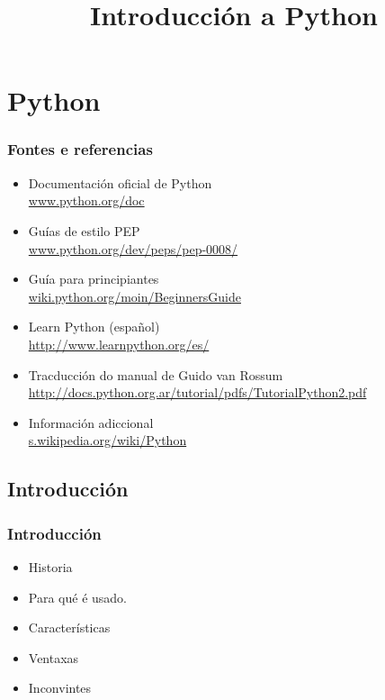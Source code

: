 
\title[Python]{Introducción a Python}
\date{}
\author[Fran Rúa/Breixo Camiña]{}
\institute{}

\section{Python}
\label{sec:Python}

\begin{frame}
  \titlepage
\end{frame}

\begin{frame}
  \frametitle{Fontes e referencias}
  \begin{itemize}
  \item Documentación oficial de Python\\
    {\color{blue}\url{www.python.org/doc}}
  \item Guías de estilo PEP\\
    {\color{blue}\url{www.python.org/dev/peps/pep-0008/}}
  \item Guía para principiantes\\
    {\color{blue}\url{wiki.python.org/moin/BeginnersGuide}}
  \item Learn Python (español)\\
    {\color{blue}\url{http://www.learnpython.org/es/}}
  \item Tracducción do manual de Guido van Rossum
    {\color{blue}\url{http://docs.python.org.ar/tutorial/pdfs/TutorialPython2.pdf}}
  \item Información adiccional\\
    {\color{blue}\url{s.wikipedia.org/wiki/Python}}
  \end{itemize}
\end{frame}

\subsection{Introducción}
\label{subsec:Introduccion}

\begin{frame}
  \frametitle{Introducción}
  \begin{itemize}
  \item Historia
  \item Para qué é usado.
  \item Características
  \item Ventaxas
  \item Inconvintes
  \end{itemize}
\end{frame}

